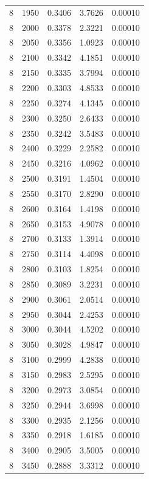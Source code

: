\begin{longtable}{ccccc}
    8 & 1950 & 0.3406 & 3.7626 & 0.00010 \\
    8 & 2000 & 0.3378 & 2.3221 & 0.00010 \\
    8 & 2050 & 0.3356 & 1.0923 & 0.00010 \\
    8 & 2100 & 0.3342 & 4.1851 & 0.00010 \\
    8 & 2150 & 0.3335 & 3.7994 & 0.00010 \\
    8 & 2200 & 0.3303 & 4.8533 & 0.00010 \\
    8 & 2250 & 0.3274 & 4.1345 & 0.00010 \\
    8 & 2300 & 0.3250 & 2.6433 & 0.00010 \\
    8 & 2350 & 0.3242 & 3.5483 & 0.00010 \\
    8 & 2400 & 0.3229 & 2.2582 & 0.00010 \\
    8 & 2450 & 0.3216 & 4.0962 & 0.00010 \\
    8 & 2500 & 0.3191 & 1.4504 & 0.00010 \\
    8 & 2550 & 0.3170 & 2.8290 & 0.00010 \\
    8 & 2600 & 0.3164 & 1.4198 & 0.00010 \\
    8 & 2650 & 0.3153 & 4.9078 & 0.00010 \\
    8 & 2700 & 0.3133 & 1.3914 & 0.00010 \\
    8 & 2750 & 0.3114 & 4.4098 & 0.00010 \\
    8 & 2800 & 0.3103 & 1.8254 & 0.00010 \\
    8 & 2850 & 0.3089 & 3.2231 & 0.00010 \\
    8 & 2900 & 0.3061 & 2.0514 & 0.00010 \\
    8 & 2950 & 0.3044 & 2.4253 & 0.00010 \\
    8 & 3000 & 0.3044 & 4.5202 & 0.00010 \\
    8 & 3050 & 0.3028 & 4.9847 & 0.00010 \\
    8 & 3100 & 0.2999 & 4.2838 & 0.00010 \\
    8 & 3150 & 0.2983 & 2.5295 & 0.00010 \\
    8 & 3200 & 0.2973 & 3.0854 & 0.00010 \\
    8 & 3250 & 0.2944 & 3.6998 & 0.00010 \\
    8 & 3300 & 0.2935 & 2.1256 & 0.00010 \\
    8 & 3350 & 0.2918 & 1.6185 & 0.00010 \\
    8 & 3400 & 0.2905 & 3.5005 & 0.00010 \\
    8 & 3450 & 0.2888 & 3.3312 & 0.00010 \\

\end{longtable}
